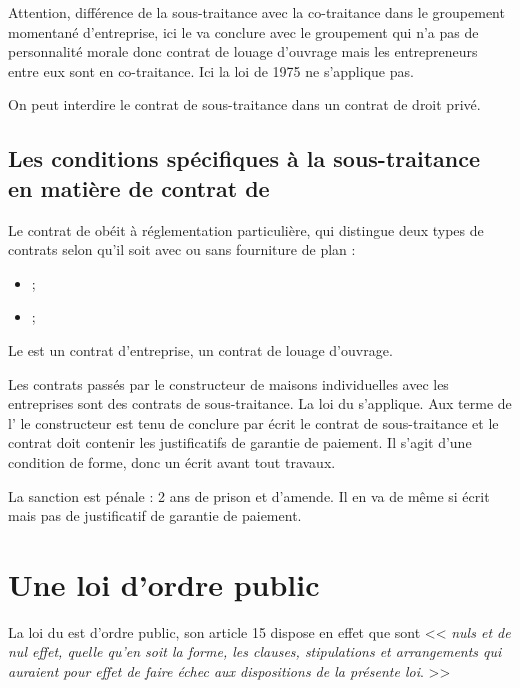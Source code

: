 			Attention, différence de la sous-traitance avec la co-traitance dans le groupement momentané d’entreprise, ici le \Mo va conclure avec le groupement qui n’a pas de personnalité morale donc contrat de louage d’ouvrage mais les entrepreneurs entre eux sont en co-traitance. Ici la loi de 1975 ne s’applique pas.


			On peut interdire le contrat de sous-traitance dans un contrat de droit privé.



	\subsection{Les conditions spécifiques à la sous-traitance en matière de contrat de \ccmi}

		Le contrat de \ccmi obéit à réglementation particulière, qui distingue deux types de contrats selon qu'il soit avec ou sans fourniture de plan :
		\begin{itemize}
			\item {} ;
			\item  {} ;
		\end{itemize}

		Le \ccmi est un contrat d’entreprise, un contrat de louage d’ouvrage.


		Les contrats passés par le constructeur de maisons individuelles avec les entreprises sont des contrats de sous-traitance. La loi du  s’applique. Aux terme de l' le constructeur est tenu de conclure par écrit le contrat de sous-traitance et le contrat doit contenir les justificatifs de garantie de paiement. Il s'agit d'une condition de forme, donc un écrit avant tout travaux.


		La sanction est pénale : 2 ans de prison et  d’amende.  Il en va de même si écrit mais pas de justificatif de garantie de paiement.


\section{Une loi d'ordre public}

	La loi du  est d’ordre public, son article 15 dispose en effet que sont << {\itshape nuls et de nul effet, quelle qu'en soit la forme, les clauses, stipulations et arrangements qui auraient pour effet de faire échec aux dispositions de la présente loi}.
>>

